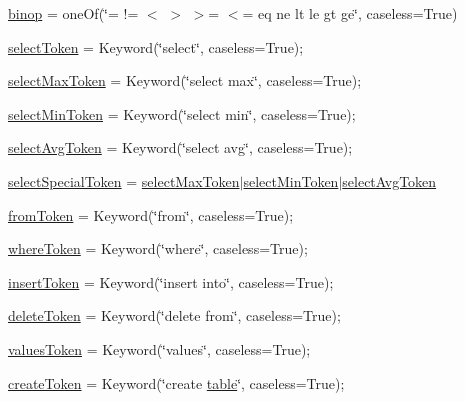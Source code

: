 \begin{DoxyCompactItemize}
\item 
\hyperlink{namespaceparse__query_ab1003cd5e59f126e1e81f9b296c3e0ca}{binop} = one\+Of(\char`\"{}= != $<$ $>$ $>$= $<$= eq ne lt le gt ge\char`\"{}, caseless=True)
\item 
\hyperlink{namespaceparse__query_aa9979d0331f3924dcf931d9d1f1aebea}{select\+Token} = Keyword(\char`\"{}select\char`\"{}, caseless=True);
\item 
\hyperlink{namespaceparse__query_a05b504fbc190ae99066e3bbea8d3cb06}{select\+Max\+Token} = Keyword(\char`\"{}select max\char`\"{}, caseless=True);
\item 
\hyperlink{namespaceparse__query_a441827d35b414007260820129ba7a0cb}{select\+Min\+Token} = Keyword(\char`\"{}select min\char`\"{}, caseless=True);
\item 
\hyperlink{namespaceparse__query_a584d3222777d316fea832ec01d0b3c5f}{select\+Avg\+Token} = Keyword(\char`\"{}select avg\char`\"{}, caseless=True);
\item 
\hyperlink{namespaceparse__query_aa03154051f4fe9a18a73ebcd36624d11}{select\+Special\+Token} = \hyperlink{namespaceparse__query_a05b504fbc190ae99066e3bbea8d3cb06}{select\+Max\+Token}$\vert$\hyperlink{namespaceparse__query_a441827d35b414007260820129ba7a0cb}{select\+Min\+Token}$\vert$\hyperlink{namespaceparse__query_a584d3222777d316fea832ec01d0b3c5f}{select\+Avg\+Token}
\item 
\hyperlink{namespaceparse__query_ae9bf3d0493a1acaac4f260dbdaf13fbd}{from\+Token} = Keyword(\char`\"{}from\char`\"{}, caseless=True);
\item 
\hyperlink{namespaceparse__query_a4b0f83d40d9f19424aab72cfca82eeba}{where\+Token} = Keyword(\char`\"{}where\char`\"{}, caseless=True);
\item 
\hyperlink{namespaceparse__query_a9e4017fe334976aee7c5d652e10def8f}{insert\+Token} = Keyword(\char`\"{}insert into\char`\"{}, caseless=True);
\item 
\hyperlink{namespaceparse__query_a2e9d87bd383bef60ce74b0badf23cd4a}{delete\+Token} = Keyword(\char`\"{}delete from\char`\"{}, caseless=True);
\item 
\hyperlink{namespaceparse__query_a23075b5f9c87912458ebe512e6c84d64}{values\+Token} = Keyword(\char`\"{}values\char`\"{}, caseless=True);
\item 
\hyperlink{namespaceparse__query_a5cd001d7c494bf0c5c026c9b14eacfca}{create\+Token} = Keyword(\char`\"{}create \hyperlink{namespaceparse__query_a45fab7a8c6d7ac5d8cf43f37b4d29b7e}{table}\char`\"{}, caseless=True);

\end{DoxyCompactItemize}
